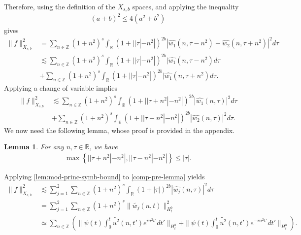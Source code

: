 \documentclass[12pt,reqno]{amsart}
\numberwithin{equation}{section}  %
\numberwithin{figure}{section}
\newcommand{\rr}{\mathbb{R}}
\newcommand{\zz}{\mathbb{Z}}
\newcommand{\wh}{\widehat}
\newcommand{\wt}{\widetilde}
\theoremstyle{plain}
\newtheorem{lemma}{Lemma}
\theoremstyle{definition}
\theoremstyle{remark}
\begin{document}
%
Therefore, using the definition of the $X_{s,b}$ spaces, and applying the
inequality 
%
%
\begin{equation*}
\begin{split}
  (a + b)^{2} \le 4(a^{2} + b^{2})
\end{split}
\end{equation*}
%
%
gives 
%
%
\begin{equation*}
\begin{split}
  \| f \|_{X_{s,b}}^{2}
  & = \sum_{n \in \zz} (1 + n^{2})^{s} \int_{\rr} (1 + |
  | \tau | - n^{2} |)^{2b} | \wh{w_{1}}(n, \tau - n^{2}) - \wh{w_{2}}(n, \tau +
  n^{2}) |^{2} d \tau
  \\
  & \lesssim  \sum_{n \in \zz} (1 + n^{2})^{s} \int_{\rr} (1 + |
  | \tau | - n^{2} |)^{2b} | \wh{w_{1}}(n, \tau - n^{2}) d \tau
  \\
  & + \sum_{n \in \zz} (1 + n^{2})^{s} \int_{\rr} (1 + |
  | \tau | - n^{2} |)^{2b} | \wh{w_{1}}(n, \tau + n^{2}) d \tau.
\end{split}
\end{equation*}
%
%
Applying a change of variable implies
%
%
%
%
\begin{equation}
\begin{split}
  \| f \|_{X_{s,b}}^{2}
  & \lesssim  \sum_{n \in \zz} (1 + n^{2})^{s} \int_{\rr} (1 + |
  | \tau + n^{2} | - n^{2} |)^{2b} | \wh{w_{1}}(n, \tau) |^2 d \tau
  \\
  & + \sum_{n \in \zz} (1 + n^{2})^{s} \int_{\rr} (1 + |
  | \tau - n^{2} | - n^{2} |)^{2b} | \wh{w_{2}}(n, \tau )|^2 d \tau.
\end{split}
\label{comp-pre-lemma}
\end{equation}
%
%
We now need the following lemma, whose proof is provided in the appendix.
%
%
%
%
%
%
%
%
\begin{lemma}
For any $n, \tau \in \rr$, we have
\label{lem:mod-princ-symb-bound}
%
%
\begin{equation*}
\begin{split}
  \max\left\{ | | \tau + n^{2} | - n^{2} |, | | \tau - n^{2} | - n^{2} |
  \right\} \le | \tau |.
\end{split}
\end{equation*}
%
%
\end{lemma}
%
%
Applying \autoref{lem:mod-princ-symb-bound} to \eqref{comp-pre-lemma} yields
%
%
\begin{equation*}
\begin{split}
\| f \|_{X_{s,b}}^{2}
  & \lesssim \sum_{j=1}^{2}  \sum_{n \in \zz} (1 + n^{2})^{s} \int_{\rr} (1 + |
  \tau|)^{2b} | \wh{w_{j}}(n, \tau)|^2 d \tau
  \\
  & = \sum_{j=1}^{2} \sum_{n \in \zz} (1 + n^{2})^{s} \|\wt{w_{j}}(n, t)
  \|^{2}_{H_{t}^{b}}
  \\
  & \simeq \sum_{n \in \zz}\left( \| \psi(t) \int_{0}^{t} \wt{u^2}(n, t')
  e^{in^{2}t'}dt'  \|_{H_{t}^{b}} + \| \psi(t) \int_{0}^{t} \wt{u^2}(n, t')
  e^{-in^{2}t'}dt'  \|_{H_{t}^{b}} \right).
\end{split}
\end{equation*}
\end{document}
